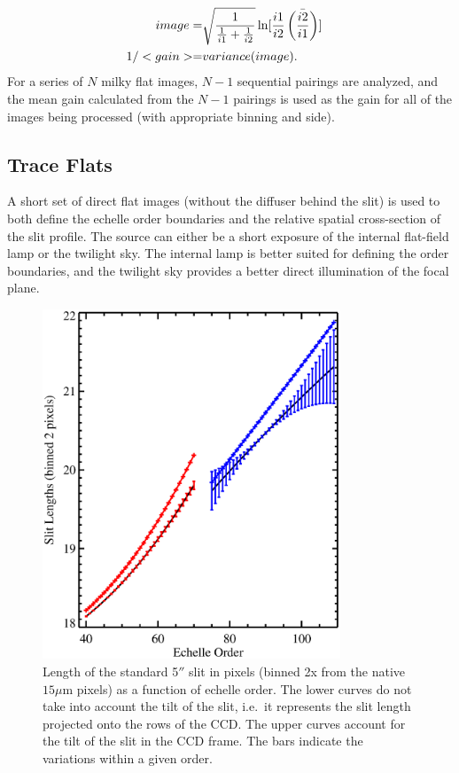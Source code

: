\documentclass[]{emulateapj}
\begin{document}
\begin{eqnarray}
image = & \sqrt{\frac{1}{\frac{1}{i1} + \frac{1}{i2}}} \, 
              {\rm ln}[\frac{i1}{i2} \, \bar{\left(\frac{i2}{i1}\right)}]  \cr
1 / <gain> = & variance(image) .
\end{eqnarray}
For a series of $N$ milky flat images, $N-1$ sequential pairings are analyzed,
and the mean gain calculated from the $N-1$ pairings is used as the gain 
for all of the images being processed (with appropriate binning and side).

\subsection{Trace Flats}
\label{sec:tflat}

A short set of direct flat images (without the diffuser behind the slit) is
used to both define the echelle order boundaries and the relative spatial
cross-section of the slit profile.  The source can either be a short
exposure of the internal flat-field lamp or the twilight sky.  
The internal lamp is better suited for defining the order boundaries, and
the twilight sky provides a better direct illumination of the focal plane.

\begin{figure}
\includegraphics[width=3.5in]{f3.eps}
\caption{Length of the standard 5$''$ slit in pixels (binned 2x from the
native $15\mu$m pixels) as a function of echelle order.  The lower curves do
not take into account the tilt of the slit, i.e.\ it represents the slit
length projected onto the rows of the CCD.  The upper curves account
for the tilt of the slit in the CCD frame. 
The bars indicate the variations within a given order.
}
\label{fig:slitlen}
\end{figure}
\end{document}
